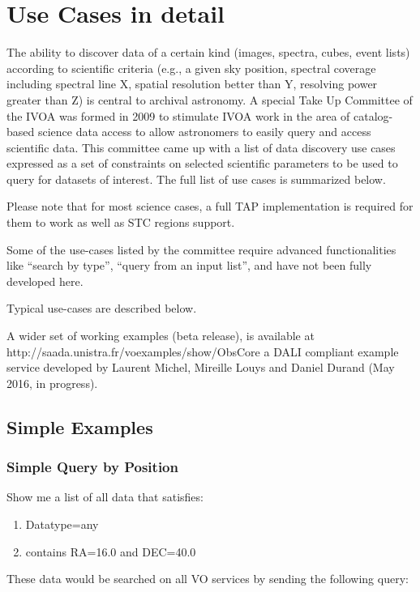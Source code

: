 \documentclass[11pt,a4paper]{ivoa}
\begin{document}


\appendix
\section{Use Cases in detail}
The ability to discover data of a certain kind (images, spectra, cubes, event lists) according to scientific criteria
(e.g., a given sky position, spectral coverage including spectral line X, spatial resolution better than Y, resolving
power greater than Z) is central to archival astronomy. A special Take Up Committee of the IVOA was formed in 2009 to
stimulate IVOA work in the area of catalog-based science data access to allow astronomers to easily query and access
scientific data.  This committee came up with a list of data discovery use cases expressed as a set of constraints on
selected scientific parameters to be used to query for datasets of interest. The full list of use cases is summarized
below.

Please note that for most science cases, a full TAP implementation is required for them to work as well as STC regions
support. \citep{2009ivoa.rept.1030R}

Some of the use-cases listed by the committee require advanced functionalities like ``search by type'', ``query from an
input list'', and have not been fully developed here.

Typical use-cases are described below. 

A wider set of working examples (beta release), is available at http://saada.unistra.fr/voexamples/show/ObsCore a DALI
compliant example service developed by Laurent Michel, Mireille Louys and Daniel Durand (May 2016, in progress).

\subsection*{Simple Examples}

\subsubsection*{Simple Query by Position}
Show me a list of all data that satisfies:
\begin{enumerate}
\item Datatype=any
\item contains RA=16.0 and DEC=40.0
\end{enumerate}
These data would be searched on all VO services by sending the following query:
\end{document}
